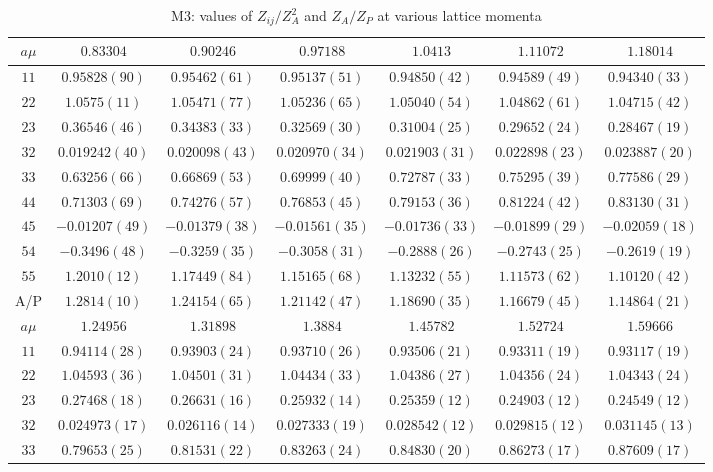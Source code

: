 \begin{table}
\begin{center}
\caption{M3: values of $Z_{ij}/Z_A^2$ and $Z_A/Z_P$ at various lattice momenta}
\begin{tabular}{c|c c c c c c}
\hline
\hline
$a\mu$ & $0.83304$ & $0.90246$ & $0.97188$ & $1.0413$ & $1.11072$ & $1.18014$ \\
\hline
$11$ & $0.95828(90)$ & $0.95462(61)$ & $0.95137(51)$ & $0.94850(42)$ & $0.94589(49)$ & $0.94340(33)$ \\
$22$ & $1.0575(11)$ & $1.05471(77)$ & $1.05236(65)$ & $1.05040(54)$ & $1.04862(61)$ & $1.04715(42)$ \\
$23$ & $0.36546(46)$ & $0.34383(33)$ & $0.32569(30)$ & $0.31004(25)$ & $0.29652(24)$ & $0.28467(19)$ \\
$32$ & $0.019242(40)$ & $0.020098(43)$ & $0.020970(34)$ & $0.021903(31)$ & $0.022898(23)$ & $0.023887(20)$ \\
$33$ & $0.63256(66)$ & $0.66869(53)$ & $0.69999(40)$ & $0.72787(33)$ & $0.75295(39)$ & $0.77586(29)$ \\
$44$ & $0.71303(69)$ & $0.74276(57)$ & $0.76853(45)$ & $0.79153(36)$ & $0.81224(42)$ & $0.83130(31)$ \\
$45$ & $-0.01207(49)$ & $-0.01379(38)$ & $-0.01561(35)$ & $-0.01736(33)$ & $-0.01899(29)$ & $-0.02059(18)$ \\
$54$ & $-0.3496(48)$ & $-0.3259(35)$ & $-0.3058(31)$ & $-0.2888(26)$ & $-0.2743(25)$ & $-0.2619(19)$ \\
$55$ & $1.2010(12)$ & $1.17449(84)$ & $1.15165(68)$ & $1.13232(55)$ & $1.11573(62)$ & $1.10120(42)$ \\
\hline
A/P & $1.2814(10)$ & $1.24154(65)$ & $1.21142(47)$ & $1.18690(35)$ & $1.16679(45)$ & $1.14864(21)$ \\
\hline
$a\mu$ & $1.24956$ & $1.31898$ & $1.3884$ & $1.45782$ & $1.52724$ & $1.59666$ \\
\hline
$11$ & $0.94114(28)$ & $0.93903(24)$ & $0.93710(26)$ & $0.93506(21)$ & $0.93311(19)$ & $0.93117(19)$ \\
$22$ & $1.04593(36)$ & $1.04501(31)$ & $1.04434(33)$ & $1.04386(27)$ & $1.04356(24)$ & $1.04343(24)$ \\
$23$ & $0.27468(18)$ & $0.26631(16)$ & $0.25932(14)$ & $0.25359(12)$ & $0.24903(12)$ & $0.24549(12)$ \\
$32$ & $0.024973(17)$ & $0.026116(14)$ & $0.027333(19)$ & $0.028542(12)$ & $0.029815(12)$ & $0.031145(13)$ \\
$33$ & $0.79653(25)$ & $0.81531(22)$ & $0.83263(24)$ & $0.84830(20)$ & $0.86273(17)$ & $0.87609(17)$ \\

\end{tabular}
\end{center}
\end{table}
